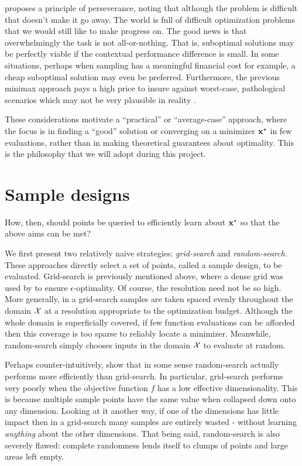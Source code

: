 \citet{lizotte} proposes a principle of perseverance, noting that although the problem is difficult that doesn't make it go away. The world is full of difficult optimization problems that we would still like to make progress on. The good news is that overwhelmingly the task is not all-or-nothing. That is, suboptimal solutions may be perfectly viable if the contextual performance difference is small. In some situations, perhaps when sampling has a meaningful financial cost for example, a cheap suboptimal solution may even be preferred. Furthermore, the previous minimax approach pays a high price to insure against worst-case, pathological scenarios which may not be very plausible in reality \citep{brochu2010interactive}. 

These considerations motivate a ``practical'' \citep{lizotte} or ``average-case'' \citep{streltsov1999non} approach, where the focus is in finding a ``good'' solution or converging on a minimizer $\mathbf{x}^\star$ in few evaluations, rather than in making theoretical guarantees about optimality. This is the philosophy that we will adopt during this project.

\section{Sample designs} \label{sampledesigns}

How, then, should points be queried to efficiently learn about $\mathbf{x}^\star$ so that the above aims can be met?

We first present two relatively naive strategies: \textit{grid-search} and \textit{random-search}. These approaches directly select a set of points, called a sample design, to be evaluated. Grid-search is previously mentioned above, where a dense grid was used by \citet{betro1991} to ensure $\epsilon$-optimality. Of course, the resolution need not be so high. More generally, in a grid-search samples are taken spaced evenly throughout the domain $\mathcal{X}$ at a resolution appropriate to the optimization budget. Although the whole domain is superficially covered, if few function evaluations can be afforded then this coverage is too sparse to reliably locate a minimizer. Meanwhile, random-search simply chooses inputs in the domain $\mathcal{X}$ to evaluate at random.

Perhaps counter-intuitively, \citet{bergstra2012random} show that in some sense random-search actually performs more efficiently than grid-search. In particular, grid-search performs very poorly when the objective function $f$ has a low effective dimensionality. This is because multiple sample points have the same value when collapsed down onto any dimension. Looking at it another way, if one of the dimensions has little impact then in a grid-search many samples are entirely wasted - without learning \textit{anything} about the other dimensions. That being said, random-search is also severely flawed: complete randomness lends itself to clumps of points and large areas left empty. 

